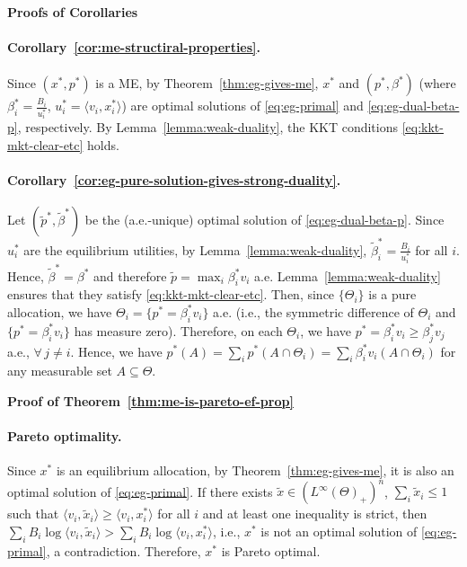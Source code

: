 	\smallskip\noindent\textbf{Proofs of Corollaries}

	\paragraph{Corollary~\ref{cor:me-structiral-properties}.} 
	Since $(x^*, p^*)$ is a ME, by Theorem~\ref{thm:eg-gives-me}, $x^*$ and $(p^*, \beta^*)$ (where $\beta^*_i = \frac{B_i}{u^*_i}$, $u^*_i = \langle v_i, x^*_i\rangle$) are optimal solutions of \eqref{eq:eg-primal} and \eqref{eq:eg-dual-beta-p}, respectively. By Lemma~\ref{lemma:weak-duality}, the KKT conditions \eqref{eq:kkt-mkt-clear-etc} holds. 

	\paragraph{Corollary~\ref{cor:eg-pure-solution-gives-strong-duality}.}
	Let $(\tilde{p}^*, \tilde{\beta}^*)$ be the (a.e.-unique) optimal solution of \eqref{eq:eg-dual-beta-p}.
	Since $u^*_i$ are the equilibrium utilities, by Lemma~\ref{lemma:weak-duality}, $\tilde{\beta}^*_i = \frac{B_i}{u^*_i}$ for all $i$. Hence, $\tilde{\beta}^* = \beta^*$ and therefore $\tilde{p} = \max_i \beta^*_i v_i$ a.e. 
	Lemma~\ref{lemma:weak-duality} ensures that they satisfy \eqref{eq:kkt-mkt-clear-etc}. 
	Then, since $\{\Theta_i\}$ is a pure allocation, we have $\Theta_i = \{ p^* = \beta^*_i v_i \}$ a.e. (i.e., the symmetric difference of $\Theta_i$ and $\{ p^* = \beta^*_i v_i \}$ has measure zero). 
	Therefore, on each $\Theta_i$, we have $p^* = \beta^*_i v_i \geq \beta^*_j v_j$ a.e., $\forall\, j\neq i$. 
	Hence, we have
	$ p^*(A) = \sum_i p^*(A\cap \Theta_i) = \sum_i \beta^*_i v_i(A\cap \Theta_i)$
	for any measurable set $A \subseteq \Theta$. 

	\smallskip\noindent\textbf{Proof of Theorem~\ref{thm:me-is-pareto-ef-prop}}

	\paragraph{Pareto optimality.}
	Since $x^*$ is an equilibrium allocation, by Theorem~\ref{thm:eg-gives-me}, it is also an optimal solution of \eqref{eq:eg-primal}. If there exists $\tilde{x}\in (L^\infty(\Theta)_+)^n$, $\sum_i \tilde{x}_i \leq 1$ such that $\langle v_i, \tilde{x}_i \rangle \geq \langle v_i, x^*_i \rangle$ for all $i$ and at least one inequality is strict, then 
	$\sum_i B_i \log \langle v_i, \tilde{x}_i \rangle > \sum_i B_i \log \langle v_i, x^*_i \rangle$,
	i.e., $x^*$ is not an optimal solution of \eqref{eq:eg-primal}, a contradiction. Therefore, $x^*$ is Pareto optimal.
	
